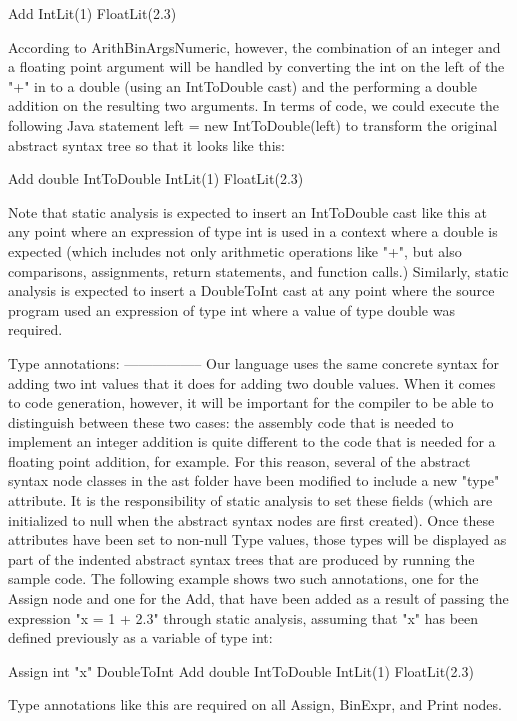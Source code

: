 \documentclass{article}
\begin{document}
  Add
    IntLit(1)
    FloatLit(2.3)

According to ArithBinArgsNumeric, however, the combination of an
integer and a floating point argument will be handled by converting
the int on the left of the "+" in to a double (using an IntToDouble
cast) and the performing a double addition on the resulting two
arguments.  In terms of code, we could execute the following Java
statement left = new IntToDouble(left) to transform the original
abstract syntax tree so that it looks like this:

  Add double
    IntToDouble
      IntLit(1)
    FloatLit(2.3)

Note that static analysis is expected to insert an IntToDouble cast
like this at any point where an expression of type int is used in a
context where a double is expected (which includes not only arithmetic
operations like "+", but also comparisons, assignments, return
statements, and function calls.)  Similarly, static analysis is
expected to insert a DoubleToInt cast at any point where the source
program used an expression of type int where a value of type double
was required.

Type annotations:
-----------------
Our language uses the same concrete syntax for adding two int values
that it does for adding two double values.  When it comes to code
generation, however, it will be important for the compiler to be able
to distinguish between these two cases: the assembly code that is
needed to implement an integer addition is quite different to the code
that is needed for a floating point addition, for example.  For this
reason, several of the abstract syntax node classes in the ast folder
have been modified to include a new "type" attribute.  It is the
responsibility of static analysis to set these fields (which are
initialized to null when the abstract syntax nodes are first
created).  Once these attributes have been set to non-null Type
values, those types will be displayed as part of the indented
abstract syntax trees that are produced by running the sample code.
The following example shows two such annotations, one for the Assign
node and one for the Add, that have been added as a result of passing
the expression "x = 1 + 2.3" through static analysis, assuming that "x"
has been defined previously as a variable of type int:

  Assign int
    "x"
    DoubleToInt
      Add double
        IntToDouble
          IntLit(1)
        FloatLit(2.3)

Type annotations like this are required on all Assign, BinExpr, and
Print nodes.
\end{document}
